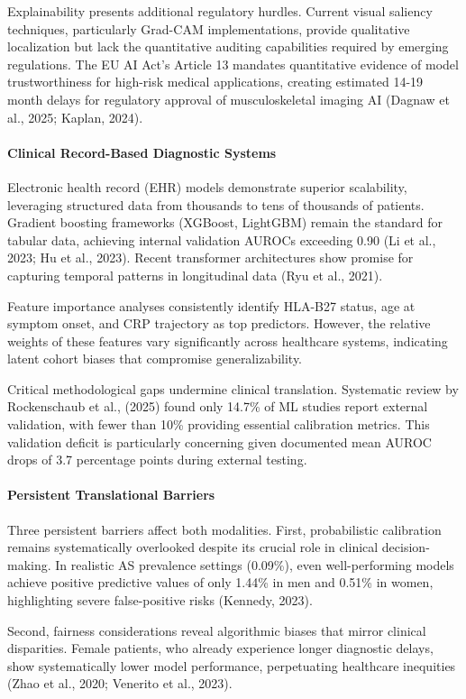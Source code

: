 \documentclass[12pt, a4paper]{article}
\begin{document}
Explainability presents additional regulatory hurdles. Current visual saliency techniques, particularly Grad-CAM implementations, provide qualitative localization but lack the quantitative auditing capabilities required by emerging regulations. The EU AI Act's Article 13 mandates quantitative evidence of model trustworthiness for high-risk medical applications, creating estimated 14-19 month delays for regulatory approval of musculoskeletal imaging AI (Dagnaw et al., 2025; Kaplan, 2024).

\paragraph{Clinical Record-Based Diagnostic Systems}
Electronic health record (EHR) models demonstrate superior scalability, leveraging structured data from thousands to tens of thousands of patients. Gradient boosting frameworks (XGBoost, LightGBM) remain the standard for tabular data, achieving internal validation AUROCs exceeding 0.90 (Li et al., 2023; Hu et al., 2023). Recent transformer architectures show promise for capturing temporal patterns in longitudinal data (Ryu et al., 2021).

Feature importance analyses consistently identify HLA-B27 status, age at symptom onset, and CRP trajectory as top predictors. However, the relative weights of these features vary significantly across healthcare systems, indicating latent cohort biases that compromise generalizability.

Critical methodological gaps undermine clinical translation. Systematic review by Rockenschaub et al., (2025) found only 14.7\% of ML studies report external validation, with fewer than 10\% providing essential calibration metrics. This validation deficit is particularly concerning given documented mean AUROC drops of 3.7 percentage points during external testing.

\paragraph{Persistent Translational Barriers}
Three persistent barriers affect both modalities. First, probabilistic calibration remains systematically overlooked despite its crucial role in clinical decision-making. In realistic AS prevalence settings (0.09\%), even well-performing models achieve positive predictive values of only 1.44\% in men and 0.51\% in women, highlighting severe false-positive risks (Kennedy, 2023).

Second, fairness considerations reveal algorithmic biases that mirror clinical disparities. Female patients, who already experience longer diagnostic delays, show systematically lower model performance, perpetuating healthcare inequities (Zhao et al., 2020; Venerito et al., 2023).
\end{document}
